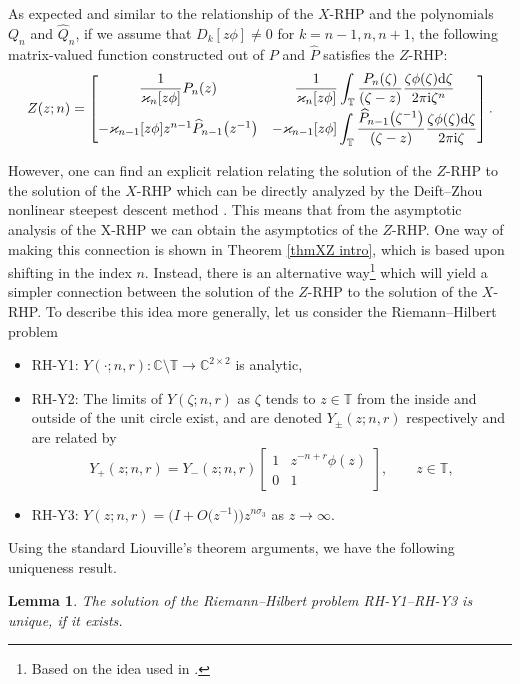 \documentclass[pdftex]{sigma}
\numberwithin{equation}{section}
\newtheorem{Lemma}[Theorem]{Lemma}
 { \theoremstyle{definition}
\newtheorem{Definition}[Theorem]{Definition}
\newtheorem{Example}[Theorem]{Example}
\newtheorem{Remark}[Theorem]{Remark}
\newtheorem{Question}[Theorem]{Question}
}
\newcommand{\C}{{\mathbb C}}
\newcommand{\T}{{\mathbb T}}
\newcommand{\ze}{\zeta}
\newcommand{\di}{\displaystyle}
\newcommand{\ii}{{\rm i}}
\newcommand{\dd}{{\rm d}}
\begin{document}
	
	
	
	
	
	As expected and similar to the relationship of the $X$-RHP and the polynomials $Q_n$ and $\widehat{Q}_n$, if we assume that $D_k[z\phi] \neq 0$ for $k=n-1, n, n+1$, the following matrix-valued function constructed out of $P$ and $\widehat{P}$ satisfies the $Z$-RHP:
	\begin{equation}\label{Toeplitz-OP-solution zphi}
		Z(z;n)=\begin{bmatrix}
			\di	\frac{1}{\varkappa_n[z\phi]} P_n(z) & \di \frac{1}{\varkappa_n[z\phi]} \int_{\T} \frac{P_n(\ze)}{(\ze-z)} \frac{\ze \phi(\ze)\dd \ze}{2\pi \ii \ze^n} \\[8pt]
			-\varkappa_{n-1}[z\phi]z^{n-1}\widehat{P}_{n-1}\big(z^{-1}\big) & \di -\varkappa_{n-1}[z\phi] \int_{\T} \frac{\widehat{P}_{n-1}\big(\ze^{-1}\big)}{(\ze-z)} \frac{\ze \phi(\ze)\dd \ze}{2\pi \ii \ze}
		\end{bmatrix}.
	\end{equation}
	
However, one can find an explicit relation relating the solution of the $Z$-RHP to the solution of the $X$-RHP which can be directly analyzed by the Deift--Zhou nonlinear steepest descent method \cite{DZ}. This means that from the asymptotic analysis of the X-RHP we can obtain the asymptotics of the $Z$-RHP. One way of making this connection is shown in Theorem \ref{thmXZ intro}, which is based upon shifting in the index $n$. Instead, there is an alternative way\footnote{Based on the idea used in \cite{GI2}.} which will yield a simpler connection between the solution of the $Z$-RHP to the solution of the $X$-RHP. To describe this idea more generally, let us consider the Riemann--Hilbert problem
	\begin{itemize}\itemsep=0pt
		\item RH-Y1: %
$Y(\cdot;n,r)\colon\C\setminus \T \to \C^{2\times2}$ is analytic,
		\item RH-Y2: %
The limits of $Y(\ze;n,r)$ as $\ze$ tends to $z \in \T $ from the inside and outside of the unit circle exist, and are denoted $Y_{\pm}(z;n,r)$ respectively and are related by
		\[
			Y_+(z;n,r)=Y_-(z;n,r)\begin{bmatrix}
				1 & z^{-n+r}\phi(z) \\
				0 & 1
			\end{bmatrix}, \qquad z \in \T,
		\]
		
		\item RH-Y3: %
$Y(z;n,r)=\big( I + O\big(z^{-1}\big) \big) z^{n \sigma_3}$ as $z \to \infty$.
	\end{itemize}
	Using the standard Liouville's theorem arguments, we have the following uniqueness result.
	\begin{Lemma}\label{uniqueness Y}
		The solution of the Riemann--Hilbert problem {\rm RH-Y1}--{\rm RH-Y3} is unique, if it exists.
	\end{Lemma}
	
\end{document}

